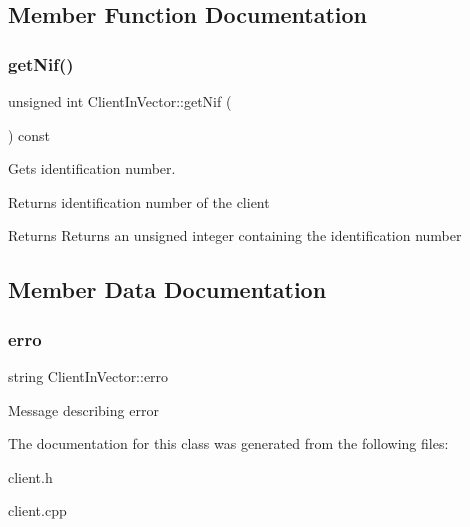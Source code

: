 \subsection{Member Function Documentation}
\mbox{\label{class_client_in_vector_adab501aba615f5d9b69bbe7a28053801}} 
\subsubsection{\texorpdfstring{get\+Nif()}{getNif()}}
{\footnotesize\ttfamily unsigned int Client\+In\+Vector\+::get\+Nif (\begin{DoxyParamCaption}{ }\end{DoxyParamCaption}) const\hspace{0.3cm}{\ttfamily [inline]}}



Gets identification number. 

Returns identification number of the client

\begin{DoxyReturn}{Returns}
Returns an unsigned integer containing the identification number 
\end{DoxyReturn}


\subsection{Member Data Documentation}
\mbox{\label{class_client_in_vector_a65d04995fa02a6f36d00540120be34b5}} 
\subsubsection{\texorpdfstring{erro}{erro}}
{\footnotesize\ttfamily string Client\+In\+Vector\+::erro}

Message describing error 

The documentation for this class was generated from the following files\+:\begin{DoxyCompactItemize}
\item 
client.\+h\item 
client.\+cpp\end{DoxyCompactItemize}
